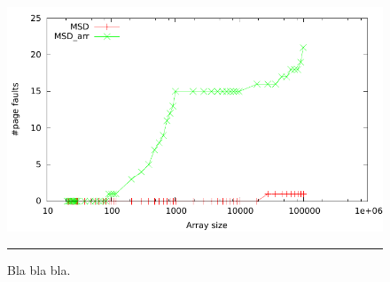 \begin{figure}[htbp]
	\centering
		\includegraphics[width=\textwidth]{./Figures/Project2b/Page_faults.pdf}
		\rule{35em}{0.5pt}
	\caption[Page faults]{
	Bla bla bla.
	}
	\label{fig:Page_faults_p2b}
\end{figure}



